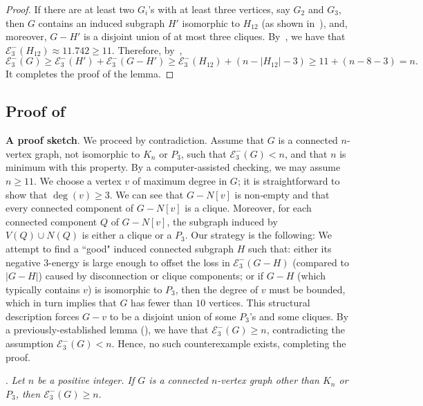 \documentclass[a4paper,12pt]{article}
\theoremstyle{plain}
\begin{document}
\begin{proof}
If there are at least two $G_i$'s with at least three vertices, say $G_2$ and $G_3$, then $G$ contains an induced subgraph $H'$ isomorphic to $H_{12}$ (as shown in~), and, moreover, $G-H'$ is a disjoint union of at most three cliques. By~, we have that $\mathcal{E}_3^{-}(H_{12})\approx 11.742\geq 11$. Therefore, by~, $$\mathcal{E}_3^{-}(G)\geq \mathcal{E}_3^{-}(H')+\mathcal{E}_3^{-}(G-H')\geq \mathcal{E}_3^{-}(H_{12})+(n-|H_{12}|-3)\geq 11+(n-8-3)=n.$$
It completes the proof of the lemma.
\end{proof}



\subsection[negative-main]{Proof of }\label{sec:mainproof}

\noindent
{\bf A proof sketch}. We proceed by contradiction. Assume that $G$ is a connected $n$-vertex graph, not isomorphic to $K_n$ or $P_3$, such that $\mathcal{E}_3^{-}(G) < n$, and that $n$ is minimum with this property. By a computer-assisted checking, we may assume $n \ge 11$. We choose a vertex $v$ of maximum degree in $G$; it is straightforward to show that $\deg(v) \ge 3$. We can see that $G-N[v]$ is non‑empty and that every connected component of $G-N[v]$ is a clique. Moreover, for each connected component $Q$ of $G-N[v]$, the subgraph induced by $V(Q) \cup N(Q)$ is either a clique or a $P_3$. Our strategy is the following: We attempt to find a ``good" induced connected subgraph $H$ such that: either its negative $3$-energy is large enough to offset the loss in $\mathcal{E}_3^-(G-H)$ (compared to $|G-H|$) caused by disconnection or clique components; or if $G-H$ (which typically contains $v$) is isomorphic to $P_3$, then the degree of $v$ must be bounded, which in turn implies that $G$ has fewer than $10$ vertices. This structural description forces $G-v$ to be a disjoint union of some $P_3$'s and some cliques. By a previously-established lemma (), we have that $\mathcal{E}_3^{-}(G) \ge n$, contradicting the assumption $\mathcal{E}_3^{-}(G) < n$. Hence, no such counterexample exists, completing the proof.


\medskip
\noindent
{\bf {}}. \emph{Let $n$ be a positive integer. If $G$ is a connected $n$-vertex graph other than $K_n$ or $P_3$, then $\mathcal{E}_3^{-}(G) \geq n.$}
\end{document}
